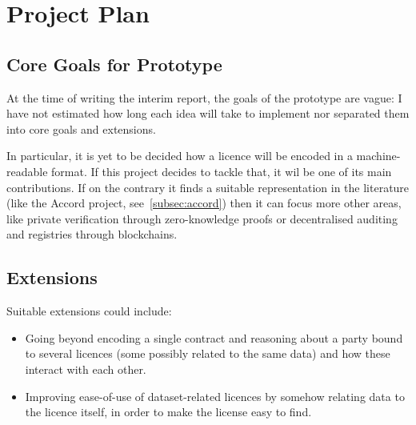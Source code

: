 
\chapter{Project Plan}\label{ch:timeline}


\section{Core Goals for Prototype}\label{sec:core-goals}

At the time of writing the interim report, the goals of the prototype are vague: I have not estimated
how long each idea will take to implement nor separated them into core goals and extensions.

In particular, it is yet to be decided how a licence will be encoded in a machine-readable format.
If this project decides to tackle that, it wil be one of its main contributions.
If on the contrary it finds a suitable representation in the literature (like the Accord
project, see~\ref{subsec:accord}) then it can focus more other areas, like private verification through
zero-knowledge proofs or decentralised auditing and registries through blockchains.


\section{Extensions}\label{sec:extensions}

Suitable extensions could include:
\begin{itemize}
    \item Going beyond encoding a single contract and reasoning about a party bound to several
    licences (some possibly related to the same data) and how these interact with each other.
    \item Improving ease-of-use of dataset-related licences by somehow relating data to the licence
    itself, in order to make the license easy to find.
\end{itemize}
\newcommand{\foo}{\color{darkgray}\makebox[0pt]{\small\textbullet}\hskip-0.5pt\vrule width 1pt\hspace{\labelsep}}
\newcommand{\bfoo}{\raisebox{2.1ex}[0pt]{\makebox[\dimexpr2\tabcolsep]
{\color{LightSteelBlue3}\tiny\textbullet}}}
\newcommand{\tfoo}{\makebox[\dimexpr2\tabcolsep]{}}%
\daymonth

\newcommand{\para}{\newline\newline}

